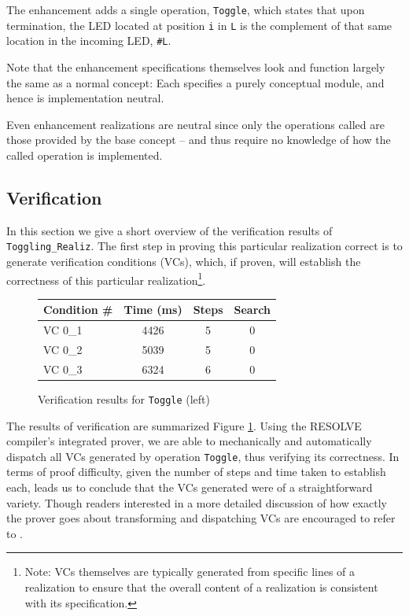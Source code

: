 \documentclass{sig-alternate}
\begin{document}
The enhancement adds a single operation, \texttt{Toggle}, which states that upon termination, the LED located at position \texttt{i} in \texttt{L} is the complement of that same location in the incoming LED, \texttt{\#L}.

Note that the enhancement specifications themselves look and function largely the same as a normal concept: Each specifies a purely conceptual module, and hence is implementation neutral. 

Even enhancement realizations are neutral since only the operations called are those provided by the base concept -- and thus require no knowledge of how the called operation is implemented.


\subsection{Verification}

In this section we give a short overview of the verification results of \texttt{Toggling\_Realiz}. The first step in proving this particular realization correct is to generate verification conditions (VCs), which, if proven, will establish the correctness of this particular realization\footnote{Note: VCs themselves are typically generated from specific lines of a realization to ensure that the overall content of a realization is consistent with its specification.}.

\begin{figure}[!htb]
\centering
\begin{tabular}{lccc}
	\toprule
	Condition \# & Time (ms)	& Steps	& Search \\
	\midrule
	VC 0\_1	& 4426	& 5	& 0	\\
	VC 0\_2	& 5039	& 5	& 0	\\
	VC 0\_3	& 6324	& 6	& 0	\\
	\bottomrule
\end{tabular}
\caption{Verification results for \texttt{Toggle} (left)}
\label{fig:results}
\end{figure}

The results of verification are summarized Figure \ref{fig:results}. Using the RESOLVE compiler's integrated prover, we are able to mechanically and automatically dispatch all VCs generated by operation \texttt{Toggle}, thus verifying its correctness. In terms of proof difficulty, given the number of steps and time taken to establish each, leads us to conclude that the VCs generated were of a straightforward variety. Though readers interested in a more detailed discussion of how exactly the prover goes about transforming and dispatching VCs are encouraged to refer to \cite{smith:2013}.
\end{document}
